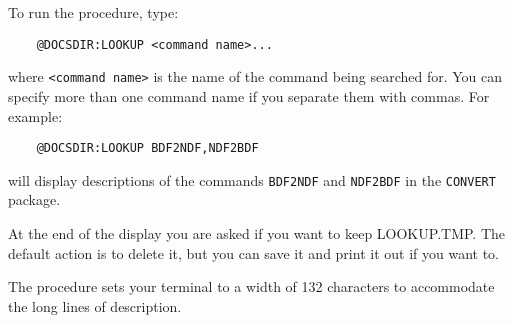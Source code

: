 To run the procedure, type:
\begin{verbatim}
    @DOCSDIR:LOOKUP <command name>...
\end{verbatim}
where \verb+<command name>+ is the name of the command being searched for.
You can specify more than one command name if you separate them with commas.
For example:
\begin{verbatim}
    @DOCSDIR:LOOKUP BDF2NDF,NDF2BDF
\end{verbatim}
will display descriptions of the commands {\tt BDF2NDF} and {\tt NDF2BDF} in 
the {\tt CONVERT} package.

At the end of the display you are asked if you want to keep LOOKUP.TMP.
The default action is to delete it, but you can save it and print it out if
you want to.

The procedure sets your terminal to a width of 132 characters to accommodate
the long lines of description.


